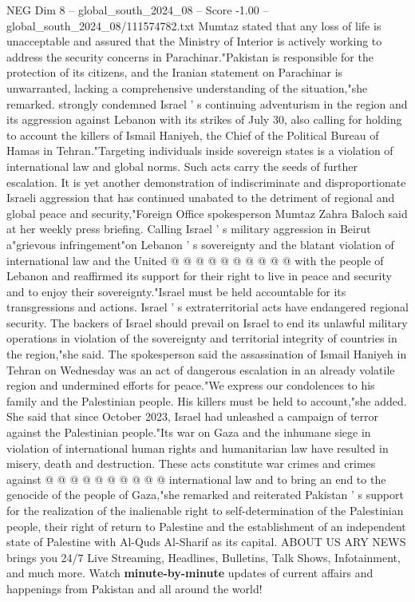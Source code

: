 \begin{textsample}{NEG Dim 8 – global\_south\_2024\_08 – Score -1.00 – global\_south\_2024\_08/111574782.txt}  \label{ex:f8_neg_071}
Mumtaz stated that any loss of life is unacceptable and assured that the Ministry of Interior is actively working to address the security concerns in Parachinar."Pakistan is responsible for the protection of its citizens, and the Iranian statement on Parachinar is unwarranted, lacking a comprehensive understanding of the situation,"she remarked. strongly condemned Israel ' s continuing adventurism in the region and its aggression against Lebanon with its strikes of July 30, also calling for holding to account the killers of Ismail Haniyeh, the Chief of the Political Bureau of Hamas in Tehran."Targeting individuals inside sovereign states is a violation of international law and global norms.
Such acts carry the seeds of further escalation.
It is yet another demonstration of indiscriminate and disproportionate Israeli aggression that has continued unabated to the detriment of regional and global peace and security,"Foreign Office spokesperson Mumtaz Zahra Baloch said at her weekly press briefing.
Calling Israel ' s military aggression in Beirut a"grievous infringement"on Lebanon ' s sovereignty and the blatant violation of international law and the United @ @ @ @ @ @ @ @ @ @ with the people of Lebanon and reaffirmed its support for their right to live in peace and security and to enjoy their sovereignty."Israel must be held accountable for its transgressions and actions.
Israel ' s extraterritorial acts have endangered regional security.
The backers of Israel should prevail on Israel to end its unlawful military operations in violation of the sovereignty and territorial integrity of countries in the region,"she said.
The spokesperson said the assassination of Ismail Haniyeh in Tehran on Wednesday was an act of dangerous escalation in an already volatile region and undermined efforts for peace."We express our condolences to his family and the Palestinian people.
His killers must be held to account,"she added.
She said that since October 2023, Israel had unleashed a campaign of terror against the Palestinian people."Its war on Gaza and the inhumane siege in violation of international human rights and humanitarian law have resulted in misery, death and destruction.
These acts constitute war crimes and crimes against @ @ @ @ @ @ @ @ @ @ international law and to bring an end to the genocide of the people of Gaza,"she remarked and reiterated Pakistan ' s support for the realization of the inalienable right to self-determination of the Palestinian people, their right of return to Palestine and the establishment of an independent state of Palestine with Al-Quds Al-Sharif as its capital.
ABOUT US ARY NEWS brings you 24/7 Live Streaming, Headlines, Bulletins, Talk Shows, Infotainment, and much more.
Watch \textbf{minute-by-minute} updates of current affairs and happenings from Pakistan and all around the world!

\end{textsample}
